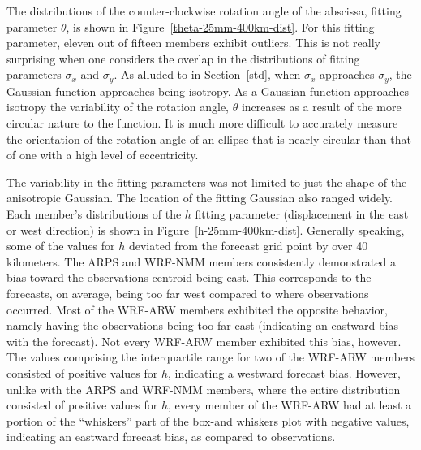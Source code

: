 The distributions of the counter-clockwise rotation angle of the abscissa, fitting parameter $\theta$, is shown in \mbox{Figure \ref{theta-25mm-400km-dist}}.
For this fitting parameter, eleven out of fifteen members exhibit outliers.
This is not really surprising when one considers the overlap in the distributions of fitting parameters $\sigma_x$ and $\sigma_y$.
As alluded to in \mbox{Section \ref{std}}, when $\sigma_x$ approaches $\sigma_y$, the Gaussian function approaches being isotropy.
As a Gaussian function approaches isotropy the variability of the rotation angle, $\theta$ increases as a result of the more circular nature to the function.
It is much more difficult to accurately measure the orientation of the rotation angle of an ellipse that is nearly circular than that of one with a high level of eccentricity.


The variability in the fitting parameters was not limited to just the shape of the anisotropic Gaussian.
The location of the fitting Gaussian also ranged widely.
Each member's distributions of the $h$ fitting parameter (displacement in the east or west direction) is shown in \mbox{Figure \ref{h-25mm-400km-dist}}.
Generally speaking, some of the values for $h$ deviated from the forecast grid point by over 40 kilometers.
The ARPS and WRF-NMM members consistently demonstrated a bias toward the observations centroid being east.
This corresponds to the forecasts, on average, being too far west compared to where observations occurred.
Most of the WRF-ARW members exhibited the opposite behavior, namely having the observations being too far east (indicating an eastward bias with the forecast).
Not every WRF-ARW member exhibited this bias, however.
The values comprising the interquartile range for two of the WRF-ARW members consisted of positive values for $h$, indicating a westward forecast bias.
However, unlike with the ARPS and WRF-NMM members, where the entire distribution consisted of positive values for $h$, every member of the WRF-ARW had at least a portion of the ``whiskers'' part of the box-and whiskers plot with negative values, indicating an eastward forecast bias, as compared to observations.














